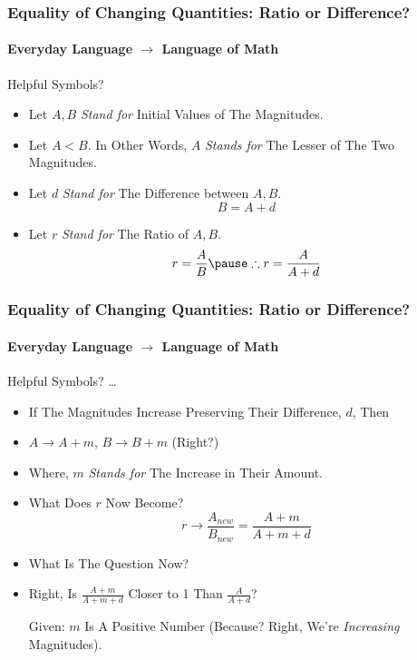 \documentclass{beamer}
\begin{document}
\begin{frame}
\frametitle{Equality of Changing Quantities: Ratio or Difference?}
\framesubtitle{Everyday Language $\rightarrow$ Language of Math}
\label{slide:expressmath2}
\begin{block}{Helpful Symbols?}
\begin{itemize}
\pause
\item Let $A,B$ \textit{Stand for} Initial Values of The Magnitudes.
\pause
\item Let $A<B$. In Other Words, $A$ \textit{Stands for} The Lesser of The Two Magnitudes.
\pause
\item Let $d$ \textit{Stand for} The Difference between $A,B$.
\pause
\begin{equation}
B=A+d
\end{equation}
\pause
\item Let $r$ \textit{Stand for} The Ratio of $A,B$.
\pause
\begin{equation}
r=\frac{A}{B} \pause\therefore r=\frac{A}{A+d}
\label{eq:newratio}
\end{equation}
\end{itemize}
\end{block}
\end{frame}

\begin{frame}
\frametitle{Equality of Changing Quantities: Ratio or Difference?}
\framesubtitle{Everyday Language $\rightarrow$ Language of Math}
\label{slide:expressmath3}
\begin{block}{Helpful Symbols? \dots}
\begin{itemize}
\item If The Magnitudes Increase Preserving Their Difference, $d$, Then
\pause
\item $A\rightarrow A+m$, $B\rightarrow B+m$ ({\tiny Right?})
\pause
\item {\tiny Where, $m$ \textit{Stands for} The Increase in Their Amount.}
\pause
\item What Does $r$ Now Become?
\pause
\begin{equation}
r\rightarrow\frac{A_{new}}{B_{new}}=\frac{A+m}{A+m+d}
\label{eq:newratio1}
\end{equation}
\pause
\item What Is The Question Now?
\pause
\item Right, \alert{Is $\frac{A+m}{A+m+d}$ Closer to 1 Than $\frac{A}{A+d}$?}\pause 

Given: $m$ Is A Positive Number (Because? \pause Right, We're \textit{Increasing} Magnitudes).
\end{itemize}
\end{block}
\end{frame}
\end{document}
